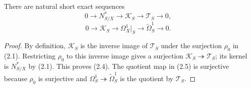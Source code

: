 \begin{proposition}
\label{prop:filtration}
There are natural short exact sequences
\[
0\longrightarrow N^*_{S/X}\longrightarrow\mathscr K_S
\longrightarrow\mathscr T_S\longrightarrow0,
\tag{2.4}
\]
\[
0\longrightarrow\mathscr K_S\longrightarrow\Omega^1_X|_S
\longrightarrow\widetilde\Omega^1_S\longrightarrow0.
\tag{2.5}
\]
\end{proposition}

\begin{proof}
By definition, $\mathscr K_S$ is the inverse image of $\mathscr T_S$ under
the surjection $\rho_0$ in (2.1).  Restricting $\rho_0$ to this inverse
image gives a surjection $\mathscr K_S\twoheadrightarrow\mathscr T_S$;
its kernel is $N^*_{S/X}$ by (2.1).  This proves (2.4).  The quotient map
in (2.5) is surjective because $\rho_0$ is surjective and
$\Omega^1_S\twoheadrightarrow\widetilde\Omega^1_S$ is the quotient by
$\mathscr T_S$.
\end{proof}

